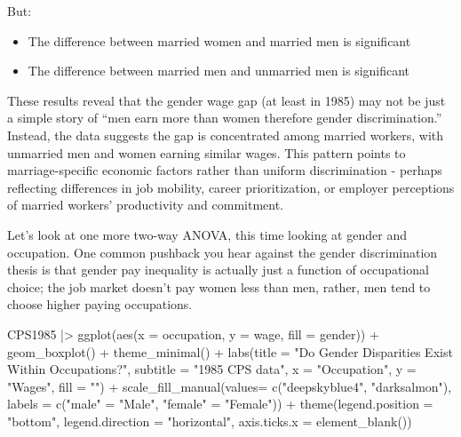 \documentclass[
  letterpaper,
]{book}
\newenvironment{Shaded}{\begin{snugshade}}{\end{snugshade}}
\newcommand{\AttributeTok}[1]{\textcolor[rgb]{0.40,0.45,0.13}{#1}}
\newcommand{\FunctionTok}[1]{\textcolor[rgb]{0.28,0.35,0.67}{#1}}
\newcommand{\NormalTok}[1]{\textcolor[rgb]{0.00,0.23,0.31}{#1}}
\newcommand{\OtherTok}[1]{\textcolor[rgb]{0.00,0.23,0.31}{#1}}
\newcommand{\SpecialCharTok}[1]{\textcolor[rgb]{0.37,0.37,0.37}{#1}}
\newcommand{\StringTok}[1]{\textcolor[rgb]{0.13,0.47,0.30}{#1}}
\providecommand{\tightlist}{%
  \setlength{\itemsep}{0pt}\setlength{\parskip}{0pt}}\usepackage{longtable,booktabs,array}
\begin{document}
But:

\begin{itemize}
\tightlist
\item
  The difference between married women and married men is significant
\item
  The difference between married men and unmarried men is significant
\end{itemize}

These results reveal that the gender wage gap (at least in 1985) may not
be just a simple story of ``men earn more than women therefore gender
discrimination.'' Instead, the data suggests the gap is concentrated
among married workers, with unmarried men and women earning similar
wages. This pattern points to marriage-specific economic factors rather
than uniform discrimination - perhaps reflecting differences in job
mobility, career prioritization, or employer perceptions of married
workers' productivity and commitment.

Let's look at one more two-way ANOVA, this time looking at gender and
occupation. One common pushback you hear against the gender
discrimination thesis is that gender pay inequality is actually just a
function of occupational choice; the job market doesn't pay women less
than men, rather, men tend to choose higher paying occupations.

\begin{Shaded}
\begin{Highlighting}[]
\NormalTok{CPS1985 }\SpecialCharTok{|\textgreater{}} \FunctionTok{ggplot}\NormalTok{(}\FunctionTok{aes}\NormalTok{(}\AttributeTok{x =}\NormalTok{ occupation, }\AttributeTok{y =}\NormalTok{ wage, }\AttributeTok{fill =}\NormalTok{ gender)) }\SpecialCharTok{+}
    \FunctionTok{geom\_boxplot}\NormalTok{() }\SpecialCharTok{+}
    \FunctionTok{theme\_minimal}\NormalTok{() }\SpecialCharTok{+}
    \FunctionTok{labs}\NormalTok{(}\AttributeTok{title =} \StringTok{"Do Gender Disparities Exist Within Occupations?"}\NormalTok{, }
         \AttributeTok{subtitle =} \StringTok{"1985 CPS data"}\NormalTok{,}
         \AttributeTok{x =} \StringTok{"Occupation"}\NormalTok{, }
         \AttributeTok{y =} \StringTok{"Wages"}\NormalTok{,}
         \AttributeTok{fill =} \StringTok{""}\NormalTok{) }\SpecialCharTok{+}
    \FunctionTok{scale\_fill\_manual}\NormalTok{(}\AttributeTok{values=} \FunctionTok{c}\NormalTok{(}\StringTok{"deepskyblue4"}\NormalTok{, }\StringTok{"darksalmon"}\NormalTok{),}
                      \AttributeTok{labels =} \FunctionTok{c}\NormalTok{(}\StringTok{"male"} \OtherTok{=} \StringTok{"Male"}\NormalTok{, }\StringTok{"female"} \OtherTok{=} \StringTok{"Female"}\NormalTok{)) }\SpecialCharTok{+}
    \FunctionTok{theme}\NormalTok{(}\AttributeTok{legend.position =} \StringTok{"bottom"}\NormalTok{,}
          \AttributeTok{legend.direction =} \StringTok{"horizontal"}\NormalTok{,}
          \AttributeTok{axis.ticks.x =} \FunctionTok{element\_blank}\NormalTok{()) }
\end{Highlighting}
\end{Shaded}
\end{document}
